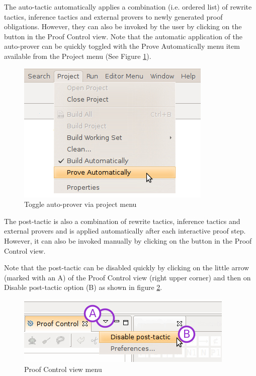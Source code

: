 The auto-tactic automatically applies a combination (i.e. ordered list) of rewrite tactics, inference tactics and external provers to newly generated proof obligations. However, they can also be invoked by the user by clicking on the  button in the \textsf{Proof Control} view. Note that the automatic application of the auto-prover can be quickly toggled with the \textsf{Prove Automatically} menu item available from the \textsf{Project} menu (See Figure \ref{fig_ref_01_proving_perspective11}).

\begin{figure}[!ht]
\begin{center}
	\includegraphics{img/reference/ref_01_proving_perspective11.png}
	\caption{Toggle auto-prover via project menu}
	\label{fig_ref_01_proving_perspective11}
\end{center}
\end{figure}

The post-tactic is also a combination of rewrite tactics, inference tactics and external provers and is applied automatically after each interactive proof step. However, it can also be invoked manually by clicking on the  button in the \textsf{Proof Control} view.

Note that the post-tactic can be disabled quickly by clicking on the little arrow (marked with an A) of the \textsf{Proof Control} view (right upper corner) and then on \textsf{Disable post-tactic} option (B) as shown in figure \ref{fig_ref_01_proving_perspective12}.

\begin{figure}[!ht]
\begin{center}
	\includegraphics{img/reference/ref_01_proving_perspective12.png}
	\caption{Proof Control view menu}
	\label{fig_ref_01_proving_perspective12}
\end{center}
\end{figure}

